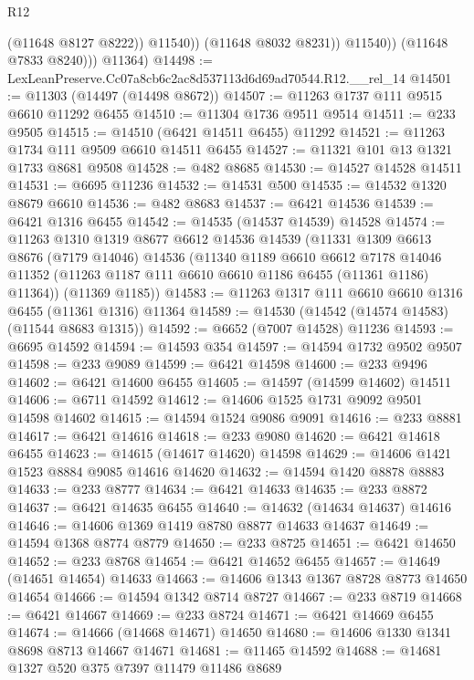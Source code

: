 \begin{lexlean}{R12}
\begin{coremodule}
                      (@11648 @8127 @8222))
                    @11540))
                (@11648 @8032 @8231))
              @11540))
          (@11648 @7833 @8240)))
      @11364)
@14498 := LexLeanPreserve.Cc07a8cb6c2ac8d537113d6d69ad70544.R12.__rel_14
@14501 := @11303 (@14497 (@14498 @8672))
@14507 := @11263 @1737 @111 @9515 @6610 @11292 @6455
@14510 := @11304 @1736 @9511 @9514
@14511 := @233 @9505
@14515 := @14510 (@6421 @14511 @6455) @11292
@14521 := @11263 @1734 @111 @9509 @6610 @14511 @6455
@14527 := @11321 @101 @13 @1321 @1733 @8681 @9508
@14528 := @482 @8685
@14530 := @14527 @14528 @14511
@14531 := @6695 @11236
@14532 := @14531 @500
@14535 := @14532 @1320 @8679 @6610
@14536 := @482 @8683
@14537 := @6421 @14536
@14539 := @6421 @1316 @6455
@14542 := @14535 (@14537 @14539) @14528
@14574 := @11263
    @1310
    @1319
    @8677
    @6612
    @14536
    @14539
    (@11331
      @1309
      @6613
      @8676
      (@7179 @14046)
      @14536
      (@11340
        @1189
        @6610
        @6612
        @7178
        @14046
        @11352
        (@11263 @1187 @111 @6610 @6610 @1186 @6455 (@11361 @1186) @11364))
      (@11369 @1185))
@14583 := @11263 @1317 @111 @6610 @6610 @1316 @6455 (@11361 @1316) @11364
@14589 := @14530 (@14542 (@14574 @14583) (@11544 @8683 @1315))
@14592 := @6652 (@7007 @14528) @11236
@14593 := @6695 @14592
@14594 := @14593 @354
@14597 := @14594 @1732 @9502 @9507
@14598 := @233 @9089
@14599 := @6421 @14598
@14600 := @233 @9496
@14602 := @6421 @14600 @6455
@14605 := @14597 (@14599 @14602) @14511
@14606 := @6711 @14592
@14612 := @14606 @1525 @1731 @9092 @9501 @14598 @14602
@14615 := @14594 @1524 @9086 @9091
@14616 := @233 @8881
@14617 := @6421 @14616
@14618 := @233 @9080
@14620 := @6421 @14618 @6455
@14623 := @14615 (@14617 @14620) @14598
@14629 := @14606 @1421 @1523 @8884 @9085 @14616 @14620
@14632 := @14594 @1420 @8878 @8883
@14633 := @233 @8777
@14634 := @6421 @14633
@14635 := @233 @8872
@14637 := @6421 @14635 @6455
@14640 := @14632 (@14634 @14637) @14616
@14646 := @14606 @1369 @1419 @8780 @8877 @14633 @14637
@14649 := @14594 @1368 @8774 @8779
@14650 := @233 @8725
@14651 := @6421 @14650
@14652 := @233 @8768
@14654 := @6421 @14652 @6455
@14657 := @14649 (@14651 @14654) @14633
@14663 := @14606 @1343 @1367 @8728 @8773 @14650 @14654
@14666 := @14594 @1342 @8714 @8727
@14667 := @233 @8719
@14668 := @6421 @14667
@14669 := @233 @8724
@14671 := @6421 @14669 @6455
@14674 := @14666 (@14668 @14671) @14650
@14680 := @14606 @1330 @1341 @8698 @8713 @14667 @14671
@14681 := @11465 @14592
@14688 := @14681 @1327 @520 @375 @7397 @11479 @11486 @8689

\end{coremodule}
\end{lexlean}
